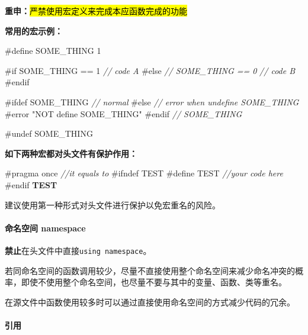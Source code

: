 \documentclass[
]{article}
\newenvironment{Shaded}{}{}
\newcommand{\CommentTok}[1]{\textcolor[rgb]{0.38,0.63,0.69}{\textit{#1}}}
\newcommand{\DecValTok}[1]{\textcolor[rgb]{0.25,0.63,0.44}{#1}}
\newcommand{\ErrorTok}[1]{\textcolor[rgb]{1.00,0.00,0.00}{\textbf{#1}}}
\newcommand{\PreprocessorTok}[1]{\textcolor[rgb]{0.74,0.48,0.00}{#1}}
\begin{document}
\textbf{重申：}\hl{严禁使用宏定义来完成本应函数完成的功能}

\textbf{常用的宏示例：}

\begin{Shaded}
\begin{Highlighting}[]
\PreprocessorTok{\#define SOME\_THING }\DecValTok{1}

\PreprocessorTok{\#if SOME\_THING == 1}
\CommentTok{// code A}
\PreprocessorTok{\#else }\CommentTok{// SOME\_THING == 0}
\CommentTok{// code B}
\PreprocessorTok{\#endif}

\PreprocessorTok{\#ifdef SOME\_THING}
\CommentTok{// normal}
\PreprocessorTok{\#else }\CommentTok{// error when undefine SOME\_THING}
\PreprocessorTok{\#error "NOT define SOME\_THING"}
\PreprocessorTok{\#endif }\CommentTok{// SOME\_THING}

\PreprocessorTok{\#undef SOME\_THING}
\end{Highlighting}
\end{Shaded}

\textbf{如下两种宏都对头文件有保护作用：}

\begin{Shaded}
\begin{Highlighting}[]
\PreprocessorTok{\#pragma once}
\CommentTok{//it equals to}
\PreprocessorTok{\#ifndef TEST}
\PreprocessorTok{\#define TEST}
\CommentTok{//your code here}
\PreprocessorTok{\#endif }\ErrorTok{TEST}
\end{Highlighting}
\end{Shaded}

建议使用第一种形式对头文件进行保护以免宏重名的风险。

\hypertarget{ux547dux540dux7a7aux95f4-namespace}{%
\paragraph{命名空间
namespace}\label{ux547dux540dux7a7aux95f4-namespace}}

\textbf{禁止}在头文件中直接\texttt{using\ namespace}。

若同命名空间的函数调用较少，尽量不直接使用整个命名空间来减少命名冲突的概率，即使不使用整个命名空间，也尽量不要与其中的变量、函数、类等重名。

在源文件中函数使用较多时可以通过直接使用命名空间的方式减少代码的冗余。

\hypertarget{ux5f15ux7528}{%
\paragraph{引用}\label{ux5f15ux7528}}
\end{document}
